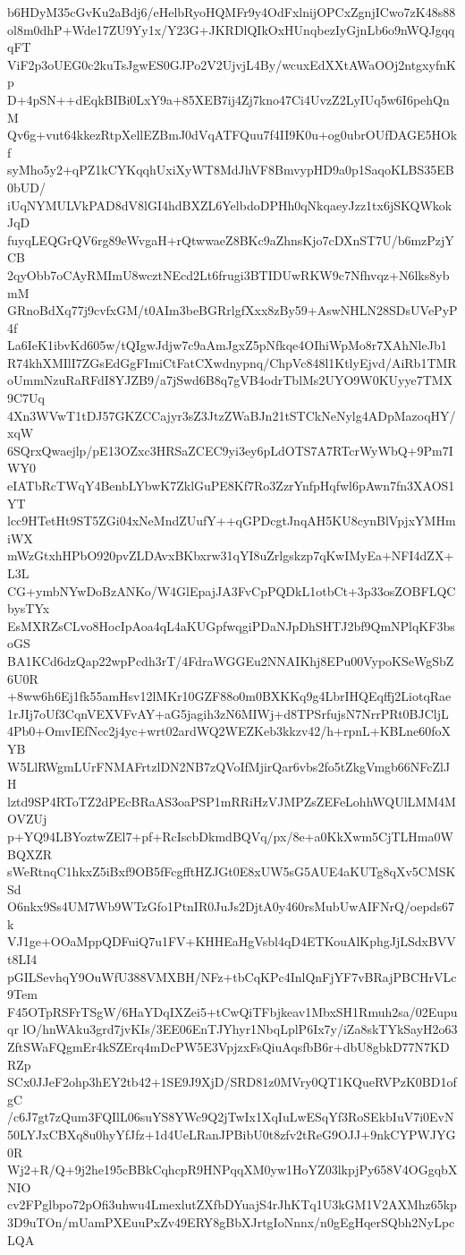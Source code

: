 b6HDyM35cGvKu2aBdj6/eHelbRyoHQMFr9y4OdFxlnijOPCxZgnjICwo7zK48s88
ol8m0dhP+Wde17ZU9Yy1x/Y23G+JKRDlQIkOxHUnqbezIyGjnLb6o9nWQJgqqqFT
ViF2p3oUEG0c2kuTsJgwES0GJPo2V2UjvjL4By/wcuxEdXXtAWaOOj2ntgxyfnKp
D+4pSN++dEqkBIBi0LxY9a+85XEB7ij4Zj7kno47Ci4UvzZ2LyIUq5w6I6pehQnM
Qv6g+vut64kkezRtpXellEZBmJ0dVqATFQuu7f4II9K0u+og0ubrOUfDAGE5HOkf
syMho5y2+qPZ1kCYKqqhUxiXyWT8MdJhVF8BmvypHD9a0p1SaqoKLBS35EB0bUD/
iUqNYMULVkPAD8dV8lGI4hdBXZL6YelbdoDPHh0qNkqaeyJzz1tx6jSKQWkokJqD
fuyqLEQGrQV6rg89eWvgaH+rQtwwaeZ8BKc9aZhnsKjo7cDXnST7U/b6mzPzjYCB
2qyObb7oCAyRMImU8wcztNEcd2Lt6frugi3BTIDUwRKW9c7Nfhvqz+N6lks8ybmM
GRnoBdXq77j9cvfxGM/t0AIm3beBGRrlgfXxx8zBy59+AswNHLN28SDsUVePyP4f
La6IeK1ibvKd605w/tQIgwJdjw7c9aAmJgxZ5pNfkqe4OIhiWpMo8r7XAhNleJb1
R74khXMIlI7ZGsEdGgFImiCtFatCXwdnypnq/ChpVc848l1KtlyEjvd/AiRb1TMR
oUmmNzuRaRFdI8YJZB9/a7jSwd6B8q7gVB4odrTblMs2UYO9W0KUyye7TMX9C7Uq
4Xn3WVwT1tDJ57GKZCCajyr3sZ3JtzZWaBJn21tSTCkNeNylg4ADpMazoqHY/xqW
6SQrxQwaejlp/pE13OZxc3HRSaZCEC9yi3ey6pLdOTS7A7RTcrWyWbQ+9Pm7IWY0
eIATbRcTWqY4BenbLYbwK7ZklGuPE8Kf7Ro3ZzrYnfpHqfwl6pAwn7fn3XAOS1YT
lcc9HTetHt9ST5ZGi04xNeMndZUufY++qGPDcgtJnqAH5KU8cynBlVpjxYMHmiWX
mWzGtxhHPbO920pvZLDAvxBKbxrw31qYI8uZrlgskzp7qKwIMyEa+NFI4dZX+L3L
CG+ymbNYwDoBzANKo/W4GlEpajJA3FvCpPQDkL1otbCt+3p33osZOBFLQCbysTYx
EsMXRZsCLvo8HocIpAoa4qL4aKUGpfwqgiPDaNJpDhSHTJ2bf9QmNPlqKF3bsoGS
BA1KCd6dzQap22wpPcdh3rT/4FdraWGGEu2NNAIKhj8EPu00VypoKSeWgSbZ6U0R
+8ww6h6Ej1fk55amHsv12lMKr10GZF88o0m0BXKKq9g4LbrIHQEqffj2LiotqRae
1rJIj7oUf3CqnVEXVFvAY+aG5jagih3zN6MIWj+d8TPSrfujsN7NrrPRt0BJCljL
4Pb0+OmvIEfNcc2j4yc+wrt02ardWQ2WEZKeb3kkzv42/h+rpnL+KBLne60foXYB
W5LlRWgmLUrFNMAFrtzlDN2NB7zQVoIfMjirQar6vbs2fo5tZkgVmgb66NFcZlJH
lztd9SP4RToTZ2dPEcBRaAS3oaPSP1mRRiHzVJMPZsZEFeLohhWQUlLMM4MOVZUj
p+YQ94LBYoztwZEl7+pf+RcIscbDkmdBQVq/px/8e+a0KkXwm5CjTLHma0WBQXZR
sWeRtnqC1hkxZ5iBxf9OB5fFcgfftHZJGt0E8xUW5sG5AUE4aKUTg8qXv5CMSKSd
O6nkx9Ss4UM7Wb9WTzGfo1PtnIR0JuJs2DjtA0y460rsMubUwAIFNrQ/oepds67k
VJ1ge+OOaMppQDFuiQ7u1FV+KHHEaHgVsbl4qD4ETKouAlKphgJjLSdxBVVt8LI4
pGILSevhqY9OuWfU388VMXBH/NFz+tbCqKPc4InlQnFjYF7vBRajPBCHrVLc9Tem
F45OTpRSFrTSgW/6HaYDqIXZei5+tCwQiTFbjkeav1MbxSH1Rmuh2sa/02Eupuqr
lO/hnWAku3grd7jvKIs/3EE06EnTJYhyr1NbqLplP6Ix7y/iZa8skTYkSayH2o63
ZftSWaFQgmEr4kSZErq4mDcPW5E3VpjzxFsQiuAqsfbB6r+dbU8gbkD77N7KDRZp
SCx0JJeF2ohp3hEY2tb42+1SE9J9XjD/SRD81z0MVry0QT1KQueRVPzK0BD1ofgC
/c6J7gt7zQum3FQIlL06suYS8YWc9Q2jTwIx1XqIuLwESqYf3RoSEkbIuV7i0EvN
50LYJxCBXq8u0hyYfJfz+1d4UeLRanJPBibU0t8zfv2tReG9OJJ+9nkCYPWJYG0R
Wj2+R/Q+9j2he195cBBkCqhcpR9HNPqqXM0yw1HoYZ03lkpjPy658V4OGgqbXNIO
cv2FPglbpo72pOfi3uhwu4LmexlutZXfbDYuajS4rJhKTq1U3kGM1V2AXMhz65kp
3D9uTOn/mUamPXEuuPxZv49ERY8gBbXJrtgIoNnnx/n0gEgHqerSQbh2NyLpcLQA
